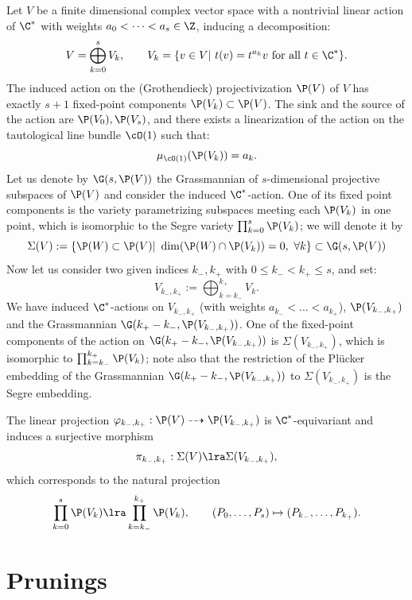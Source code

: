 \documentclass[reqno]{amsproc}
\theoremstyle{definition}
\begin{document}
Let $V$ be a finite dimensional complex vector space with a nontrivial linear action of $\C^*$ with weights $a_0<\dots<a_s\in\Z$, inducing a decomposition:
$$
V=\bigoplus_{k=0}^s V_k,\qquad V_k=\{v\in V|\,\, t(v)=t^{a_k}v\,\,\mbox{for all }t\in\C^*\}.
$$
The induced action on the (Grothendieck) projectivization $\P(V)$ of $V$ has exactly $s+1$ fixed-point components $\P(V_k)\subset \P(V)$. The sink and the source of the action are $\P(V_0),\P(V_s)$, and there exists a linearization of the action on the tautological line bundle $\cO(1)$ such that:
$$
\mu_{\cO(1)}(\P(V_k))=a_k.
$$ 
Let us denote by $\G(s,\P(V))$ the Grassmannian of $s$-dimensional projective subspaces of $\P(V)$ and consider the induced $\C^*$-action. One of its fixed point components is the variety parametrizing subspaces meeting each $\P(V_k)$ in one point, which is isomorphic to the Segre variety $\prod_{k=0}^s\P(V_k)$; we will denote it by  
\begin{equation}\label{wors6:eq:Sigma}\Sigma(V):=\{\P(W)\subset \P(V)|\,\, \dim(\P(W)\cap \P(V_k))=0,\,\, \forall k\}\subset \G(s,\P(V))\end{equation}
Now let us consider two given indices $k_-,k_+$ with $0\leq k_-<k_+\leq s$, and set:
$$
V_{k_-,k_+}:=\bigoplus_{k=k_-}^{k_+} V_k.
$$
We have induced $\C^*$-actions on $V_{k_-,k_+}$ (with weights $a_{k_-}<\dots<a_{k_+}$), $\P(V_{k_-,k_+})$ and the Grassmannian $\G(k_+-k_-,\P(V_{k_-,k_+}))$. One of the fixed-point components of the action on $\G(k_+-k_-,\P(V_{k_-,k_+}))$ is $\Sigma(V_{k_-,k_+})$, which is isomorphic to $\prod_{k=k_-}^{k_+}\P(V_k)$; note also that the restriction of the Pl\"ucker embedding of the Grassmannian  $\G(k_+-k_-,\P(V_{k_-,k_+}))$ to $\Sigma(V_{k_-,k_+})$ is the Segre embedding.


The linear projection $\varphi_{k_-,k_+}:\P(V)\dashrightarrow \P(V_{k_-,k_+})$ is $\C^*$-equivariant and induces a surjective morphism 
$$
\pi_{k_-,k_+}:\Sigma(V)\lra \Sigma(V_{k_-,k_+}),
$$ 
which corresponds to the natural projection $$\prod_{k=0}^s\P(V_k)\lra\prod_{k={k_-}}^{k_+}\P(V_k),\qquad (P_0,\dots,P_s)\mapsto (P_{k_-},\dots,P_{k_+}).$$




\section{Prunings}\label{wors6:sec:prun}
\end{document}
